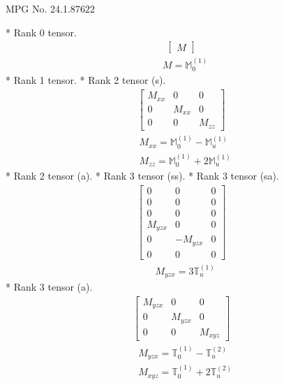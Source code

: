 \documentclass[fleqn,8pt,landscape]{jsarticle}
\begin{document}
\setcounter{MaxMatrixCols}{32}

\renewcommand{\tablename}{Table~}
\renewcommand{\figurename}{Figure~}
\begin{center}
\LARGE
MPG No. 24.1.87\quad$622$
\end{center}
* Rank 0 tensor.
\begin{align*}
\begin{bmatrix} M \end{bmatrix}
\end{align*}
\begin{align*}
& M = \mathbb{M}_{0}^{(1)}
\end{align*}
* Rank 1 tensor.
* Rank 2 tensor (s).
\begin{align*}
\begin{bmatrix} M_{xx} & 0 & 0 \\ 0 & M_{xx} & 0 \\ 0 & 0 & M_{zz} \end{bmatrix}
\end{align*}
\begin{align*}
& M_{xx} = \mathbb{M}_{0}^{(1)} - \mathbb{M}_{u}^{(1)} \\
& M_{zz} = \mathbb{M}_{0}^{(1)} + 2 \mathbb{M}_{u}^{(1)}
\end{align*}
* Rank 2 tensor (a).
* Rank 3 tensor (ss).
* Rank 3 tensor (sa).
\begin{align*}
\begin{bmatrix} 0 & 0 & 0 \\ 0 & 0 & 0 \\ 0 & 0 & 0 \\ M_{yzx} & 0 & 0 \\ 0 & - M_{yzx} & 0 \\ 0 & 0 & 0 \end{bmatrix}
\end{align*}
\begin{align*}
& M_{yzx} = 3 \mathbb{T}_{u}^{(1)}
\end{align*}
* Rank 3 tensor (a).
\begin{align*}
\begin{bmatrix} M_{yzx} & 0 & 0 \\ 0 & M_{yzx} & 0 \\ 0 & 0 & M_{xyz} \end{bmatrix}
\end{align*}
\begin{align*}
& M_{yzx} = \mathbb{T}_{0}^{(1)} - \mathbb{T}_{u}^{(2)} \\
& M_{xyz} = \mathbb{T}_{0}^{(1)} + 2 \mathbb{T}_{u}^{(2)}
\end{align*}
\end{document}
